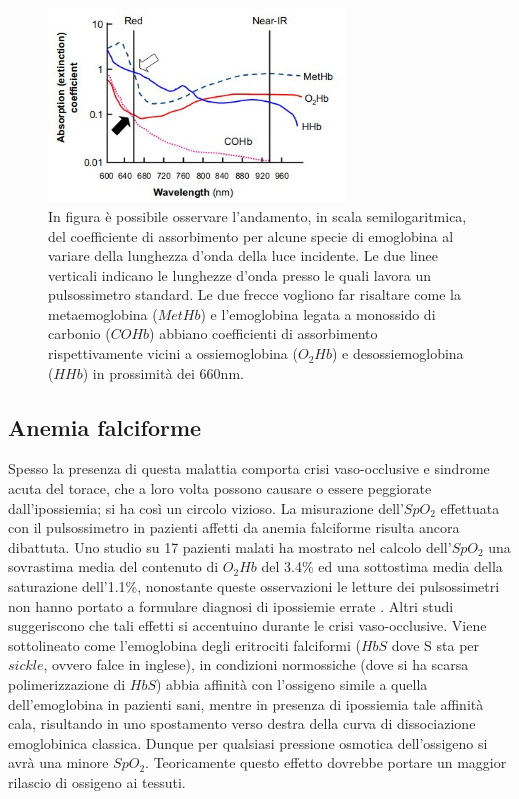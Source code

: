 \documentclass[a4paper, 12pt]{book}
\begin{document}
\begin{figure}[h!]
    \centering
    \includegraphics[width=0.7\textwidth]{multidiss.jpg}
    \caption{In figura è possibile osservare l'andamento, in scala semilogaritmica, del 			 coefficiente di assorbimento per alcune specie di emoglobina al variare 					 della lunghezza d'onda della luce incidente.
  		     Le due linee verticali indicano le lunghezze d'onda presso le quali lavora 			 un pulsossimetro standard.
 		     Le due frecce vogliono far risaltare come la metaemoglobina ($MetHb$) e 					 l'emoglobina legata a monossido di carbonio ($COHb$) abbiano coefficienti 					 di assorbimento rispettivamente vicini a ossiemoglobina ($O_2Hb$) e 						 desossiemoglobina ($HHb$) in prossimità dei 660nm.}
    \label{fig:multidissociation}
\end{figure}


\subsection{Anemia falciforme}

Spesso la presenza di questa malattia comporta crisi vaso-occlusive e sindrome acuta del torace, che a loro volta possono causare o essere peggiorate dall'ipossiemia; si ha così un circolo vizioso.
La misurazione dell'$SpO_2$ effettuata con il pulsossimetro in pazienti affetti da anemia falciforme risulta ancora dibattuta.
Uno studio su 17 pazienti malati ha mostrato nel calcolo dell'$SpO_2$ una sovrastima media del contenuto di $O_2Hb$ del 3.4\% ed una sottostima media della saturazione dell'1.1\%, nonostante queste osservazioni le letture dei pulsossimetri non hanno portato a formulare diagnosi di ipossiemie errate \cite{Sickle}.
Altri studi suggeriscono che tali effetti si accentuino durante le crisi vaso-occlusive.
Viene sottolineato come l'emoglobina degli eritrociti falciformi ($HbS$ dove S sta per $sickle$, ovvero falce in inglese), in condizioni normossiche (dove si ha scarsa polimerizzazione di $HbS$) abbia affinità con l'ossigeno simile a quella dell'emoglobina in pazienti sani, mentre in presenza di ipossiemia tale affinità cala, risultando in uno spostamento verso destra della curva di dissociazione emoglobinica classica.
Dunque per qualsiasi pressione osmotica dell'ossigeno si avrà una minore $SpO_2$. Teoricamente questo effetto dovrebbe portare un maggior rilascio di ossigeno ai tessuti.
\end{document}
